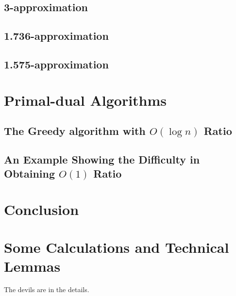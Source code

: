 \documentclass[oneside,final]{ucr}
\begin{document}
\section{3-approximation}

\section{1.736-approximation}

\section{1.575-approximation}

\chapter{Primal-dual Algorithms} \label{ch: primal-dual}

\section{The Greedy algorithm with $O(\log n)$ Ratio}

\section{An Example Showing the Difficulty in Obtaining $O(1)$ Ratio}

\chapter{Conclusion} \label{ch: conclusion}




\appendix
\chapter{Some Calculations and Technical Lemmas}
The devils are in the details.
\end{document}
